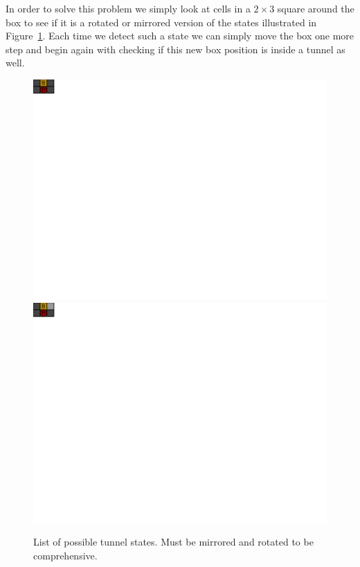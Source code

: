 \documentclass[a4paper,11pt]{article}
\renewcommand{\*}[0]{\cdot}
\begin{document}
In order to solve this problem we simply look at cells in a $2 \times 3$ square
around the box to see if it is a rotated or mirrored version of the states
illustrated in Figure~\ref{fig:tunnelPossibilities}. Each time we detect such a
state we can simply move the box one more step and begin again with checking if
this new box position is inside a tunnel as well.

\begin{figure}[h!]
    \begin{center}
        \includegraphics{figures/tunnelPossibilities1}
        \includegraphics{figures/tunnelPossibilities2}
    \end{center}
    \caption{List of possible tunnel states. Must be mirrored and rotated to be
    comprehensive.}
    \label{fig:tunnelPossibilities}
\end{figure}
\end{document}

